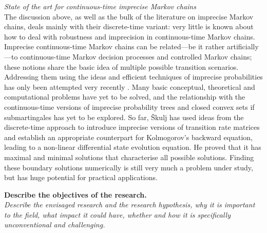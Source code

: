 \documentclass[11pt,dvipsnames,usenames,a4paper]{article}
\begin{document}
\emph{State of the art for continuous-time imprecise Markov chains}\\[5pt]
The discussion above, as well as the bulk of the literature on imprecise Markov chains, deals mainly with their discrete-time variant: very little is known about how to deal with robustness and imprecision in continuous-time Markov chains. 
Imprecise continuous-time Markov chains can be related---be it rather artificially---to continuous-time Markov decision processes and controlled Markov chains; these notions share the basic idea of multiple possible transition scenarios.
Addressing them using the ideas and efficient techniques of imprecise probabilities has only been attempted very recently \cite{skulj2015:continuous:bounds,Troffaes+GSB-ISIPTA15p,DeBock:2016:iCTMClimit}.
Many basic conceptual, theoretical and computational problems have yet to be solved, and the relationship with the continuous-time versions of imprecise probability trees and closed convex sets if submartingales has yet to be explored.
So far, Škulj \cite{skulj2015:continuous:bounds} has used ideas from the discrete-time approach to introduce imprecise versions of transition rate matrices and establish an appropriate counterpart for Kolmogorov's backward equation, leading to a non-linear differential state evolution equation. 
He proved that it has maximal and minimal solutions that characterise all possible solutions. Finding these boundary solutions numerically is still very much a problem under study, but has huge potential for practical applications.

\vspace{3mm}

\textbf{Describe the objectives of the research.}\\
\textit{Describe the envisaged research and the research hypothesis, why it is important to the field, what impact it could have, whether and how it is specifically unconventional and challenging.}
\end{document}
